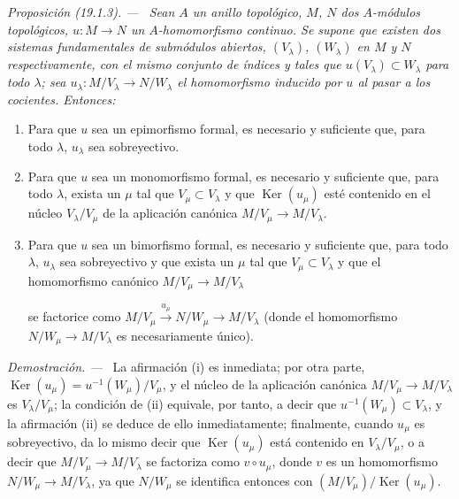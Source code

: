 \documentclass[10pt,oneside]{book}
\makeatletter
\newcommand{\setmanualcurrentlabel}[1]{\def\@currentlabel{#1}}
\newcommand{\oldpage}[2][]{%
  \setcounter{footnote}{0}%
  \marginpar{\scriptsize\textbf{#1}~|~#2}\ignorespaces}
\newenvironment{proposition}[1][]{%
  \setmanualcurrentlabel{#1}\par\medskip\noindent\itshape Proposición (#1). ---\ }{\par}
\newenvironment{proof}{%
  \par\medskip\noindent\textit{Demostración. ---\ }}{\par}
\makeatother
\begin{document}
\begin{proposition}[19.1.3]
\label{0.19.1.3-es}
Sean $A$ un anillo topológico, $M$, $N$ dos $A$-módulos topológicos,
$u:M\to N$ un $A$-homomorfismo continuo. Se supone que existen dos sistemas
fundamentales de submódulos abiertos, $(V_\lambda)$, $(W_\lambda)$ en $M$ y
$N$ respectivamente, con el mismo conjunto de índices y tales que
$u(V_\lambda)\subset W_\lambda$ para todo $\lambda$; sea
$u_\lambda:M/V_\lambda\to N/W_\lambda$ el homomorfismo inducido por $u$ al
pasar a los cocientes. Entonces:
\begin{enumerate}
  \item[\textup{(i)}] Para que $u$ sea un epimorfismo formal, es necesario y suficiente que,
  para todo $\lambda$, $u_\lambda$ sea sobreyectivo.
  \item[\textup{(ii)}] Para que $u$ sea un monomorfismo formal, es necesario y suficiente
  que, para todo $\lambda$, exista un $\mu$ tal que
  $V_\mu\subset V_\lambda$ y que $\operatorname{Ker}(u_\mu)$ esté contenido
  en el núcleo $V_\lambda/V_\mu$ de la aplicación canónica
  $M/V_\mu\to M/V_\lambda$.
  \item[\textup{(iii)}] Para que $u$ sea un bimorfismo formal, es necesario y suficiente
  que, para todo $\lambda$, $u_\lambda$ sea sobreyectivo y que exista un
  $\mu$ tal que $V_\mu\subset V_\lambda$ y que el homomorfismo canónico
  $M/V_\mu\to M/V_\lambda$

  \oldpage[0\textsubscript{IV-1}]{72}

  \noindent se factorice como
  $M/V_\mu\xrightarrow{u_\mu}N/W_\mu\to M/V_\lambda$ (donde
  el homomorfismo $N/W_\mu\to M/V_\lambda$ es necesariamente único).
\end{enumerate}
\end{proposition}

\begin{proof}
La afirmación (i) es inmediata; por otra parte,
$\operatorname{Ker}(u_\mu)=u^{-1}(W_\mu)/V_\mu$, y el núcleo de la aplicación
canónica $M/V_\mu\to M/V_\lambda$ es $V_\lambda/V_\mu$; la condición de
(ii) equivale, por tanto, a decir que $u^{-1}(W_\mu)\subset V_\lambda$, y la afirmación
(ii) se deduce de ello inmediatamente; finalmente, cuando $u_\mu$ es sobreyectivo, da lo mismo
decir que $\operatorname{Ker}(u_\mu)$ está contenido en
$V_\lambda/V_\mu$, o a decir que $M/V_\mu\to M/V_\lambda$ se factoriza como
$v\circ u_\mu$, donde $v$ es un homomorfismo
$N/W_\mu\to M/V_\lambda$, ya que $N/W_\mu$ se identifica entonces con
$(M/V_\mu)/\operatorname{Ker}(u_\mu)$.
\end{proof}
\end{document}
